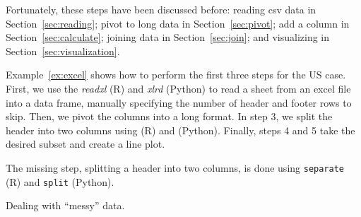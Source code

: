 Fortunately, these steps have been discussed before: reading csv data in Section~\ref{sec:reading}; pivot to long data in Section~\ref{sec:pivot};
add a column in Section~\ref{sec:calculate}; joining data in Section~\ref{sec:join}; and visualizing in Section~\ref{sec:visualization}.

Example~\ref{ex:excel} shows how to perform the first three steps for the US case.
First, we use the \emph{readxl} (R) and \emph{xlrd} (Python) to read a sheet from an excel file into a data frame,
manually specifying the number of header and footer rows to skip.
 Then, we pivot the columns into a  long format.
In step 3, we split the header into two columns using  (R) and  (Python). Finally, steps 4 and 5 take the desired subset and create a line plot. 

The missing step, splitting a header into two columns, is done using \texttt{separate} (R) and \texttt{split} (Python).

\begin{ccsexample}
  \begin{tcolorbox}[title=Output]
    \texttt{[image: \{snippets/chapter06/excel2.r]}.png}
  \end{tcolorbox}
  \caption{Dealing with ``messy'' data.}\label{ex:excel}
\end{ccsexample}

